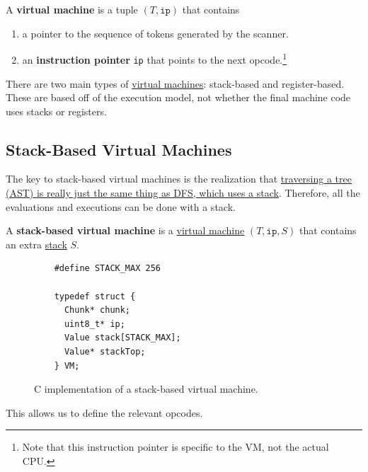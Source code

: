   \begin{definition}
    \label{def:virtual-machine}
    A \textbf{virtual machine} is a tuple $(T, \texttt{ip})$ that contains 
    \begin{enumerate}
      \item a pointer to the sequence of tokens generated by the scanner. 
      \item an \textbf{instruction pointer} \texttt{ip} that points to the next opcode.\footnote{Note that this instruction pointer is specific to the VM, not the actual CPU.}
    \end{enumerate}
  \end{definition}

  There are two main types of \hyperref[def:virtual-machine]{virtual machines}: stack-based and register-based. These are based off of the execution model, not whether the final machine code uses stacks or registers. 

\subsection{Stack-Based Virtual Machines} 

  The key to stack-based virtual machines is the realization that \hyperref[dsa-thm:tree_traversal_dfs]{traversing a tree (AST) is really just the same thing as DFS, which uses a stack}. Therefore, all the evaluations and executions can be done with a stack. 

  \begin{definition}
    \label{def:stack-based-virtual-machine}
    A \textbf{stack-based virtual machine} is a \hyperref[def:virtual-machine]{virtual machine} $(T, \texttt{ip}, S)$ that contains an extra \hyperref[dsa-def:stack]{stack} $S$. 

    \begin{figure}[H]
      \centering 
      \begin{lstlisting}
	#define STACK_MAX 256

	typedef struct {
	  Chunk* chunk;
	  uint8_t* ip;
	  Value stack[STACK_MAX]; 
	  Value* stackTop;
	} VM;
      \end{lstlisting}
      \caption{C implementation of a stack-based virtual machine.} 
      \label{fig:stack_based_vm}
    \end{figure}
  \end{definition}

  This allows us to define the relevant opcodes. 

